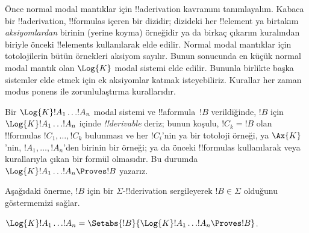 



Önce normal modal mantıklar için !!a{derivation} kavramını tanımlayalım.
Kabaca bir !!a{derivation}, !!{formula}s içeren bir dizidir; dizideki her
!!{element} ya birtakım \emph{aksiyomlardan} birinin (yerine koyma) örneğidir
ya da birkaç çıkarım kuralından biriyle önceki !!{element}s kullanılarak elde edilir. Normal modal
mantıklar için totolojilerin bütün örnekleri
 aksiyom sayılır.
Bunun sonucunda en küçük normal modal mantık olan $\Log{K}$ modal sistemi
elde edilir. Bununla birlikte başka sistemler elde etmek için ek aksiyomlar
katmak isteyebiliriz. Kurallar her zaman modus ponens \MP{} ile
zorunlulaştırma \Nec{} kurallarıdır.

\begin{defn}
  Bir $\Log{K}!A_1\dots !A_n$ modal sistemi ve !!a{formula}~$!B$
  verildiğinde, $!B$ için $\Log{K}!A_1\dots !A_n$ içinde
  \emph{!!{derivable}} deriz; bunun
  koşulu, $!C_k=!B$ olan !!{formula}s $!C_1,\dots,!C_k$ bulunması ve her
  $!C_i$'nin ya bir totoloji örneği, ya $\Ax{K}$'nin,
   $!A_1,\dots,!A_n$'den birinin bir
  örneği; ya da önceki !!{formula}s kullanılarak \MP{} veya \Nec{} kurallarıyla çıkan
  bir formül olmasıdır. Bu durumda
  $\Log{K}!A_1\dots !A_n\Proves !B$ yazarız.
\end{defn}

Aşağıdaki önerme, $!B$ için bir $\Sigma$-!!{derivation} sergileyerek
$!B\in\Sigma$ olduğunu göstermemizi sağlar.

\begin{prop}
  $\Log{K}!A_1\dots !A_n=
  \Setabs{!B}{\Log{K}!A_1\dots !A_n\Proves !B}$.
\end{prop}

